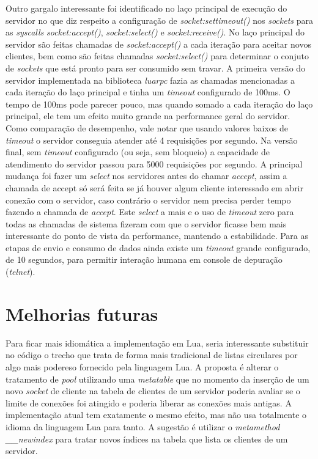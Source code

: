 \documentclass[11pt]{article}
\begin{document}
Outro gargalo interessante foi identificado no laço principal de execução do
servidor no que diz respeito a configuração de \textit{socket:settimeout()} nos
\textit{sockets} para as \textit{syscalls} \textit{socket:accept()},
\textit{socket:select()} e \textit{socket:receive()}. No laço principal do
servidor são feitas chamadas de \textit{socket:accept()} a cada iteração para
aceitar novos clientes, bem como são feitas chamadas \textit{socket:select()}
para determinar o conjuto de \textit{sockets} que está pronto para ser consumido
sem travar. A primeira versão do servidor implementada na biblioteca
\textit{luarpc} fazia as chamadas mencionadas a cada iteração do laço principal
e tinha um \textit{timeout} configurado de 100ms. O tempo de 100ms pode parecer
pouco, mas quando somado a cada iteração do laço principal, ele tem um efeito
muito grande na performance geral do servidor. Como comparação de desempenho,
vale notar que usando valores baixos de \textit{timeout} o servidor conseguia
atender até 4 requisições por segundo. Na versão final, sem \textit{timeout}
configurado (ou seja, sem bloqueio) a capacidade de atendimento do servidor
passou para 5000 requisições por segundo. A principal mudança foi fazer um
\textit{select} nos servidores antes do chamar \textit{accept}, assim a chamada
de accept só será feita se já houver algum cliente interessado em abrir conexão
com o servidor, caso contrário o servidor nem precisa perder tempo fazendo a
chamada de \textit{accept}. Este \textit{select} a mais e o uso de
\textit{timeout} zero para todas as chamadas de sistema fizeram com que o
servidor ficasse bem mais interessante do ponto de vista da performance,
mantendo a estabilidade. Para as etapas de envio e consumo de dados ainda existe
um \textit{timeout} grande configurado, de 10 segundos, para permitir interação
humana em console de depuração (\textit{telnet}).

\section{Melhorias futuras}\label{sec:future}

Para ficar mais idiomática a implementação em Lua, seria interessante
substituir no código o trecho que trata de forma mais tradicional de listas
circulares por algo mais podereso fornecido pela linguagem Lua. A proposta é
alterar o tratamento de \textit{pool} utilizando uma
\textit{metatable}\cite{metat} que no momento da inserção de um novo
\textit{socket} de cliente na tabela de clientes de um servidor poderia avaliar
se o limite de conexões foi atingido e poderia liberar as conexões mais
antigas. A implementação atual tem exatamente o mesmo efeito, mas não usa
totalmente o idioma da linguagem Lua para tanto. A sugestão é utilizar o
\textit{metamethod} \textit{__newindex} para tratar novos índices na tabela que
lista os clientes de um servidor.
\end{document}
